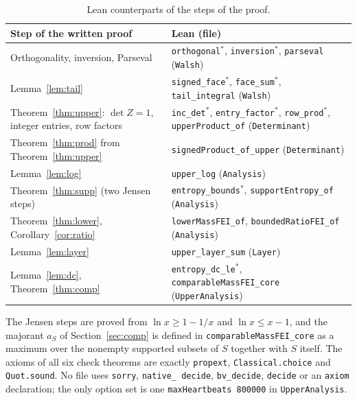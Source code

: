 \documentclass[11pt]{article}
\theoremstyle{definition}
\theoremstyle{remark}
\begin{document}
{\begin{table}[!htbp]
\centering\footnotesize
\renewcommand{\arraystretch}{1.05}
\begin{tabular}{@{}>{\raggedright\arraybackslash}p{}>{\raggedright\arraybackslash}p{}@{}}
\hline
Step of the written proof & Lean (file) \\
\hline
Orthogonality, inversion, Parseval & \texttt{orthogonal}$^*$, \texttt{inversion}$^*$,
\texttt{parseval} (\texttt{Walsh}) \\
Lemma~\ref{lem:tail} & \texttt{signed\_face}$^*$, \texttt{face\_sum}$^*$,
\texttt{tail\_integral} (\texttt{Walsh}) \\
Theorem~\ref{thm:upper}: $\det Z=1$, integer entries, row factors &
\texttt{inc\_det}$^*$, \texttt{entry\_factor}$^*$, \texttt{row\_prod}$^*$,
\texttt{upperProduct\_of} (\texttt{Determinant}) \\
Theorem~\ref{thm:prod} from Theorem~\ref{thm:upper} &
\texttt{signedProduct\_of\_upper} (\texttt{Determinant}) \\
Lemma~\ref{lem:log} & \texttt{upper\_log} (\texttt{Analysis}) \\
Theorem~\ref{thm:supp} (two Jensen steps) & \texttt{entropy\_bounds}$^*$,
\texttt{supportEntropy\_of} (\texttt{Analysis}) \\
Theorem~\ref{thm:lower}, Corollary~\ref{cor:ratio} & \texttt{lowerMassFEI\_of},
\texttt{boundedRatioFEI\_of} (\texttt{Analysis}) \\
Lemma~\ref{lem:layer} & \texttt{upper\_layer\_sum} (\texttt{Layer}) \\
Lemma~\ref{lem:dc}, Theorem~\ref{thm:comp} & \texttt{entropy\_dc\_le}$^*$,
\texttt{comparableMassFEI\_core} (\texttt{UpperAnalysis}) \\
\hline
\end{tabular}
\caption{Lean counterparts of the steps of the proof.}
\label{tab:lean}
\end{table}

\noindent The Jensen steps are proved from $\ln x\ge1-1/x$ and $\ln x\le x-1$,
and the majorant $a_S$ of Section~\ref{sec:comp} is defined in
\texttt{comparableMassFEI\_core} as a maximum over the nonempty supported
subsets of $S$ together with $S$ itself. The axioms of all six check theorems
are exactly \texttt{propext}, \texttt{Classical.choice} and
\texttt{Quot.sound}. No file uses \texttt{sorry}, \texttt{native\_\allowbreak
decide}, \texttt{bv\_\allowbreak decide}, \texttt{decide} or an \texttt{axiom}
declaration; the only option set is one \texttt{maxHeartbeats 800000} in
\texttt{UpperAnalysis}.

}
\end{document}
